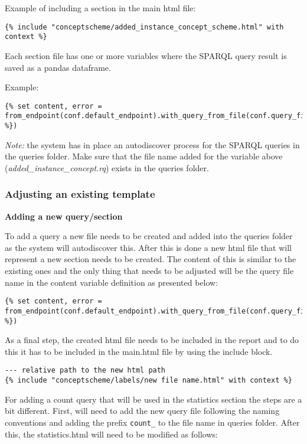 Example of including a section in the main html file:
\begin{lstlisting}
{% include "conceptscheme/added_instance_concept_scheme.html" with context %}
\end{lstlisting}

Each section file has one or more variables where the SPARQL query result is saved as a pandas dataframe.

Example:
\begin{lstlisting}
{% set content, error = from_endpoint(conf.default_endpoint).with_query_from_file(conf.query_files["added_instance_concept.rq"]).fetch_tabular() %})
\end{lstlisting}

\textit{Note:} the system has in place an autodiscover process for the SPARQL queries in the queries folder. Make sure that the file name added for the variable above (\textit{added\_instance\_concept.rq}) exists in the queries folder.

\subsubsection{Adjusting an existing template}
\textbf{Adding a new query/section}

To add a query a new file needs to be created and added into the queries folder as the system will autodiscover this. After this is done a new html file that will represent a new section needs to be created. The content of this is similar to the existing ones and the only thing that needs to be adjusted will be the query file name in the content variable definition as presented below:

\begin{lstlisting}
{% set content, error = from_endpoint(conf.default_endpoint).with_query_from_file(conf.query_files["new_query_file.rq"]).fetch_tabular() %})
\end{lstlisting}

As a final step, the created html file needs to be included in the report and to do this it has to be included in the main.html file by using the include block.

\begin{lstlisting}
--- relative path to the new html path
{% include "conceptscheme/labels/new file name.html" with context %}
\end{lstlisting}

For adding a count query that will be used in the statistics section the steps are a bit different. First, will need to add the new query file following the naming conventions and adding the prefix \texttt{count\_} to the file name in queries folder. After this, the statistics.html will need to be modified as follows:

